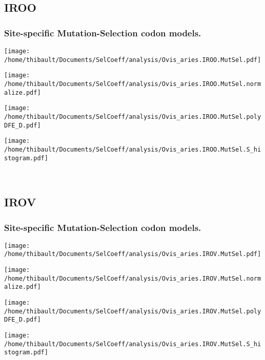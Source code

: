 \subsection{IROO} 
 
\subsubsection*{Site-specific Mutation-Selection codon models.} 
\begin{minipage}{0.49\linewidth} 
\texttt{[image: /home/thibault/Documents/SelCoeff/analysis/Ovis\_aries.IROO.MutSel.pdf]} 
\end{minipage}
\begin{minipage}{0.49\linewidth} 
\texttt{[image: /home/thibault/Documents/SelCoeff/analysis/Ovis\_aries.IROO.MutSel.normalize.pdf]} 
\end{minipage}
\begin{minipage}{0.49\linewidth} 
\texttt{[image: /home/thibault/Documents/SelCoeff/analysis/Ovis\_aries.IROO.MutSel.polyDFE\_D.pdf]} 
\end{minipage}
\begin{minipage}{0.49\linewidth} 
\texttt{[image: /home/thibault/Documents/SelCoeff/analysis/Ovis\_aries.IROO.MutSel.S\_histogram.pdf]} 
\end{minipage}
\\ 
\subsection{IROV} 
 
\subsubsection*{Site-specific Mutation-Selection codon models.} 
\begin{minipage}{0.49\linewidth} 
\texttt{[image: /home/thibault/Documents/SelCoeff/analysis/Ovis\_aries.IROV.MutSel.pdf]} 
\end{minipage}
\begin{minipage}{0.49\linewidth} 
\texttt{[image: /home/thibault/Documents/SelCoeff/analysis/Ovis\_aries.IROV.MutSel.normalize.pdf]} 
\end{minipage}
\begin{minipage}{0.49\linewidth} 
\texttt{[image: /home/thibault/Documents/SelCoeff/analysis/Ovis\_aries.IROV.MutSel.polyDFE\_D.pdf]} 
\end{minipage}
\begin{minipage}{0.49\linewidth} 
\texttt{[image: /home/thibault/Documents/SelCoeff/analysis/Ovis\_aries.IROV.MutSel.S\_histogram.pdf]} 
\end{minipage}
\\ 
